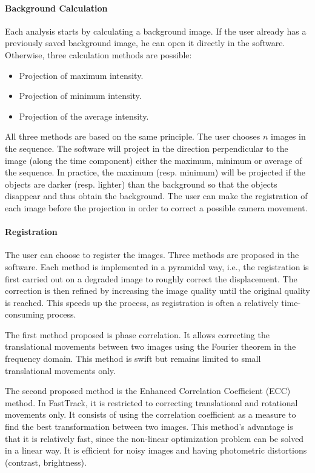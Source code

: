         \paragraph{Background Calculation}
        Each analysis starts by calculating a background image. If the user already has a previously saved background image, he can open it directly in the software. Otherwise, three calculation methods are possible:
        \begin{itemize}
            \item Projection of maximum intensity.
            \item Projection of minimum intensity.
            \item Projection of the average intensity.
        \end{itemize}
        All three methods are based on the same principle. The user chooses $n$ images in the sequence. The software will project in the direction perpendicular to the image (along the time component) either the maximum, minimum or average of the sequence. In practice, the maximum (resp. minimum) will be projected if the objects are darker (resp. lighter) than the background so that the objects disappear and thus obtain the background. The user can make the registration of each image before the projection in order to correct a possible camera movement.

        \paragraph{Registration}
        The user can choose to register the images. Three methods are proposed in the software. Each method is implemented in a pyramidal way, i.e., the registration is first carried out on a degraded image to roughly correct the displacement. The correction is then refined by increasing the image quality until the original quality is reached. This speeds up the process, as registration is often a relatively time-consuming process.


        The first method proposed is phase correlation. It allows correcting the translational movements between two images using the Fourier theorem in the frequency domain. This method is swift but remains limited to small translational movements only.


        The second proposed method is the Enhanced Correlation Coefficient (ECC) method. In FastTrack, it is restricted to correcting translational and rotational movements only. It consists of using the correlation coefficient as a measure to find the best transformation between two images. This method's advantage is that it is relatively fast, since the non-linear optimization problem can be solved in a linear way. It is efficient for noisy images and having photometric distortions (contrast, brightness).


